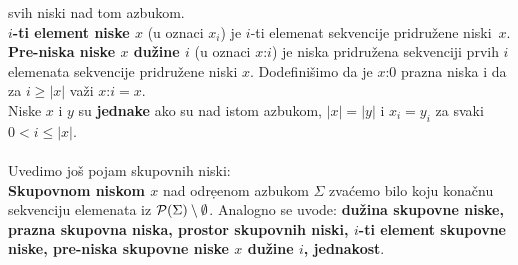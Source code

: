     svih niski nad tom azbukom.\\
    {\bf $i$-ti element niske $x$} (u oznaci $x_i$) je $i$-ti elemenat
    sekvencije pridru\v{z}ene niski~$x$.\\
    {\bf Pre-niska niske $x$ du\v{z}ine $i$} (u oznaci $x$:$i$) je
    niska pridru\v{z}ena sekvenciji prvih $i$ elemenata sekvencije
    pridru\v{z}ene niski $x$.
    Dodefini\v{s}imo da je $x$:$0$ prazna niska i da za $i\ge|x|$
    va\v{z}i $x$:$i=x$.\\
    Niske $x$ i $y$ su {\bf jednake} ako su nad istom azbukom, $|x|=|y|$
    i $x_i=y_i$ za svaki $0<i\le|x|$.\\
    \\
    Uvedimo jo\v{s} pojam skupovnih niski:\\
    {\bf Skupovnom niskom $x$} nad odre{\d}enom azbukom $\Sigma$ zva\'cemo
    bilo koju kona\v{c}nu sekvenciju elemenata iz
    ${\cal P}(\Sigma)\setminus\emptyset$.
    Analogno se uvode: {\bf du\v{z}ina skupovne niske{\rm,} prazna skupovna
    niska{\rm,} prostor skupovnih niski{\rm,} $i$-ti element skupovne
    niske{\rm,} pre-niska skupovne niske $x$ du\v{z}ine $i${\rm,} jednakost}.
%
%
